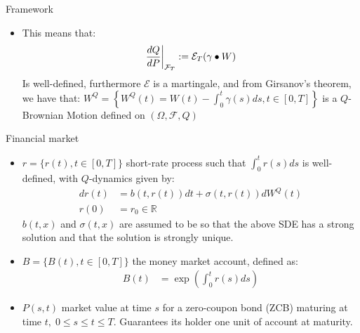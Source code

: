 \documentclass[UKenglish]{beamer}
\newcommand{\F}{\mathcal{F}} %
\newcommand{\R}{\mathbb{R}}  %
\begin{document}
\begin{frame}{Framework}
\begin{itemize}
    \item This means that: 
    \begin{align*}
    \frac{dQ}{dP}\bigg{|}_{\F_{T}} := \mathcal{E}_{T}(\gamma \bullet W)   
    \end{align*}
    Is well-defined, furthermore $\mathcal{E}$ is a martingale, and from Girsanov's theorem, we have that: $W^{Q} = \left\{W^{Q}(t) = W(t) - \int_{0}^{t}\gamma(s)ds, t\in [0,T]\right\} $ is a $Q$-Brownian Motion defined on $(\Omega, \F, Q)$
\end{itemize} 
\end{frame}

\begin{frame}{Financial market}
\begin{itemize}
    \item $r = \{r(t), t\in [0,T]\}$ short-rate process such that $\int_{0}^{t}r(s)ds$ is well-defined, with $Q$-dynamics given by: 
    \begin{align*}
    dr(t) &= b(t,r(t))dt + \sigma(t,r(t))dW^{Q}(t)  \\
    r(0) &= r_{0} \in \R
    \end{align*}
    $b(t,x)$ and $\sigma(t,x)$ are assumed to be so  
    that the above SDE has a strong solution and that the solution is strongly unique.  
    \item $B = \{B(t), t\in [0,T]\}$ the money market account, defined as: 
    \begin{align*}
        B(t) &= \exp\left(
        \int_{0}^{t}r(s)ds
        \right)
    \end{align*}
    \item $P(s,t)$ market value at time $s$ for a zero-coupon bond (ZCB) maturing at time $t,\; 0\leq s\leq t \leq T$. Guarantees its holder one unit of account at maturity. 
\end{itemize}
\end{frame}
\end{document}
